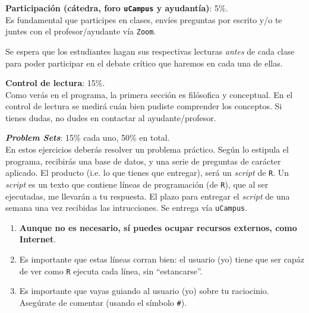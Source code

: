\documentclass[letterpaper]{article}
\renewenvironment{itemize}{
  \begin{list}{}{
    \setlength{\leftmargin}{1.5em}
  }
}{
  \end{list}
}
\begin{document}
\begin{enumerate}

	\item {\bf Participaci\'on (c\'atedra, foro \texttt{uCampus} y ayudant\'ia)}: 5\%. \\
	Es fundamental que participes en clases, env\'ies preguntas por escrito y/o te juntes con el profesor/ayudante v\'ia \texttt{Zoom}.

		\begin{itemize}
    		\item[{\color{red}\Pointinghand}] Se espera que los estudiantes hagan sus respectivas lecturas \emph{antes} de cada clase para poder participar en el debate cr\'itico que haremos en cada una de ellas. %
    	\end{itemize}

	\item {\bf Control de lectura}: 15\%. \\
	Como ver\'as en el programa, la primera secci\'on es fil\'osofica y conceptual. En el control de lectura se medir\'a cu\'an bien pudiste comprender los conceptos. Si tienes dudas, no dudes en contactar al ayudante/profesor.


	\item {\bf \emph{Problem Sets}}: 15\% cada uno, 50\% en total.\\
	En estos ejercicios deber\'as resolver un problema pr\'actico. Seg\'un lo estipula el programa, recibir\'as una base de datos, y una serie de preguntas de car\'acter aplicado. El producto (i.e. lo que tienes que entregar), ser\'a un \emph{script} de \texttt{R}. Un \emph{script} es un texto que contiene l\'ineas de programaci\'on (de \texttt{R}), que al ser ejecutadas, me llevar\'an a tu respuesta. El plazo para entregar el \emph{script} de una semana una vez recibidas las intrucciones. Se entrega v\'ia \texttt{uCampus}.


		\begin{enumerate}
		    \item[$\circ$] {\bf Aunque no es necesario, s\'i puedes ocupar recursos externos, como Internet}.
		    \item[$\circ$] Es importante que estas l\'ineas corran bien: el usuario (yo) tiene que ser cap\'az de ver como \texttt{R} ejecuta cada l\'inea, sin ``estancarse''.
		    \item[$\circ$] Es importante que vayas guiando al usuario (yo) sobre tu raciocinio. Aseg\'urate de comentar (usando el s\'imbolo \texttt{\#}).
		\end{enumerate}



\end{enumerate}
\end{document}

